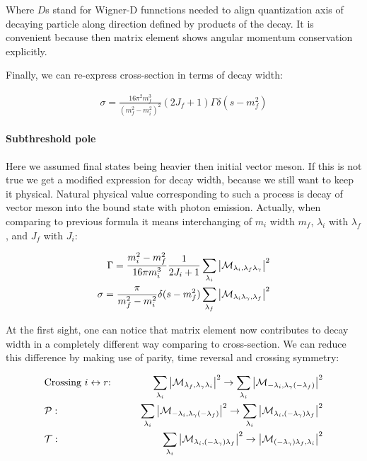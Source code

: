 Where $D$s stand for Wigner-D funnctions needed to align quantization axis of decaying particle along direction defined by products of the decay. It is convenient because then matrix element shows angular momentum conservation explicitly.

Finally, we can re-express cross-section in terms of decay width:

\begin{align} \label{eq:app:crsc-dw}
    \sigma = \frac{16 \pi^2 m_f^3}{(m_f^2 - m_i^2)^2} (2J_f + 1) \Gamma \delta(s - m_f^2)
\end{align}

\paragraph{Subthreshold pole} Here we assumed final states being heavier then initial vector meson. If this is not true we get a modified expression for decay width, because we still want to keep it physical. Natural physical value corresponding to such a process is decay of vector meson into the bound state with photon emission. Actually, when comparing to previous formula it means interchanging of $m_i$ width $m_f$, $\lambda_i$ with $\lambda_f$, and $J_f$ with $J_i$:

\begin{align}
        \Gamma = \frac{m_i^2 - m_f^2}{16 \pi m_i^3} \frac{1}{2J_i + 1} \sum_{\lambda_i} \abs{\mathcal{M}_{\lambda_i, \lambda_f \lambda_\gamma}}^2 \\
        \sigma = \frac{\pi}{m_f^2 - m_i^2} \delta(s - m_f^2) \sum_{\lambda_f} \abs{\mathcal{M}_{\lambda_i \lambda_\gamma, \lambda_f}}^2
\end{align}

At the first sight, one can notice that matrix element now contributes to decay width in a completely different way comparing to cross-section. We can reduce this difference by making use of parity, time reversal and crossing symmetry:

\begin{align}
    &\text{Crossing $i \leftrightarrow r$:}\qquad &\sum_{\lambda_i} \abs{\mathcal{M}_{\lambda_f, \lambda_\gamma \lambda_i}}^2 \rightarrow \sum_{\lambda_i} \abs{\mathcal{M}_{-\lambda_i, \lambda_\gamma (-\lambda_f)}}^2 \\
    &\mathcal{P}:\qquad &\sum_{\lambda_i} \abs{\mathcal{M}_{-\lambda_i, \lambda_\gamma (-\lambda_f)}}^2 \rightarrow \sum_{\lambda_i} \abs{\mathcal{M}_{\lambda_i, (-\lambda_\gamma) \lambda_f}}^2\\
    &\mathcal{T}:\qquad &\sum_{\lambda_i} \abs{\mathcal{M}_{\lambda_i, (-\lambda_\gamma) \lambda_f}}^2 \rightarrow \abs{\mathcal{M}_{(-\lambda_\gamma) \lambda_f, \lambda_i}}^2
\end{align}


